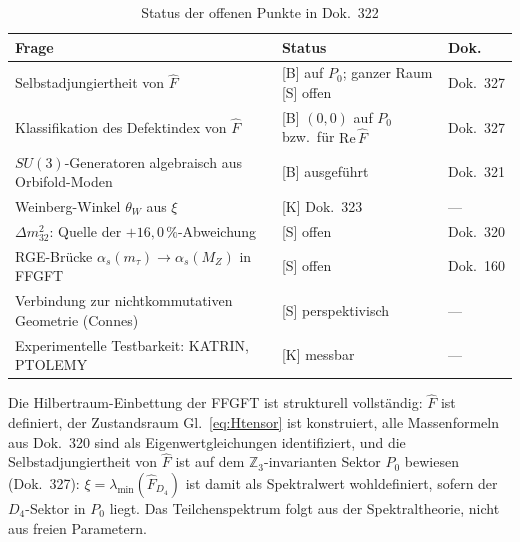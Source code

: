 \begin{table}[h]
\centering
\caption{Status der offenen Punkte in Dok.~322}
\label{tab:offen}
\begin{tabular}{lll}
\toprule
Frage & Status & Dok. \\
\midrule
Selbstadjungiertheit von $\hat{F}$
  & [B] auf $P_0$; ganzer Raum [S] offen & Dok.~327 \\
Klassifikation des Defektindex von $\hat{F}$
  & [B] $(0,0)$ auf $P_0$ bzw.\ für $\mathrm{Re}\,\hat{F}$ & Dok.~327 \\
$SU(3)$-Generatoren algebraisch aus Orbifold-Moden
  & [B] ausgeführt & Dok.~321 \\
Weinberg-Winkel $\theta_W$ aus $\xi$
  & [K] Dok.~323 & --- \\
$\Delta m_{32}^2$: Quelle der $+16{,}0\,\%$-Abweichung
  & [S] offen & Dok.~320 \\
RGE-Brücke $\alpha_s(m_\tau) \to \alpha_s(M_Z)$ in FFGFT
  & [S] offen & Dok.~160 \\
Verbindung zur nichtkommutativen Geometrie (Connes)
  & [S] perspektivisch & --- \\
Experimentelle Testbarkeit: KATRIN, PTOLEMY
  & [K] messbar & --- \\
\bottomrule
\end{tabular}
\end{table}

\begin{keyresult}
Die Hilbertraum-Einbettung der FFGFT ist strukturell vollständig:
$\hat{F}$ ist definiert, der Zustandsraum Gl.~\eqref{eq:Htensor}
ist konstruiert, alle Massenformeln aus Dok.~320 sind als
Eigenwertgleichungen identifiziert, und die Selbstadjungiertheit
von $\hat{F}$ ist auf dem $\mathbb{Z}_3$-invarianten Sektor $P_0$ bewiesen (Dok.~327): $\xi = \lambda_{\min}(\hat{F}_{D_4})$
ist damit als Spektralwert wohldefiniert, sofern der $D_4$-Sektor in $P_0$ liegt.
Das Teilchenspektrum folgt aus der Spektraltheorie, nicht aus
freien Parametern.
\end{keyresult}
